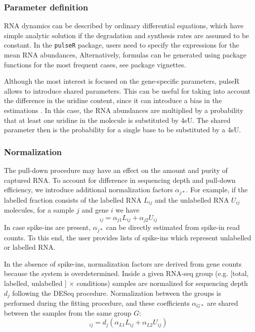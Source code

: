 \subsubsection*{Parameter definition}
RNA dynamics can be described by ordinary differential equations,
which have simple analytic solution 
if the degradation and synthesis rates are assumed to be constant.
In the \verb|pulseR| package,
users need to specify the expressions for the mean RNA abundances,
Alternatively, formulas can be generated using package functions for the 
most frequent cases, see package vignettes. 

Although the most interest is focused on the gene-specific parameters,
pulseR allows to introduce shared parameters.
 This can be useful for taking into account the difference in the uridine content, since
it can introduce a bias in the estimations \citep{miller2011dynamic,
schwalb2012measurement}.
In this case, the RNA abundances are multiplied by 
a probability that at least one uridine in the molecule is substituted by 4sU.
The shared parameter then is the probability for a single base to be substituted
by a 4sU.
\subsubsection*{Normalization}
The pull-down procedure may have an effect on the amount and purity of captured RNA.
To account for difference in sequencing depth and pull-down efficiency,
we introduce additional normalization factors $\alpha_{j*}$. 
 For example, 
if the labelled fraction consists of the labelled RNA $L_{ij}$ and the unlabelled RNA
 $U_{ij}$ molecules, for a sample $j$ and gene $i$ we have 
\begin{equation}
 [\text{labelled fraction}]_{ij}  = \alpha_{j1} L_{ij} + \alpha_{j2} U_{ij}
\end{equation}
In case spike-ins are present, $\alpha_{j*}$  can be directly estimated from spike-in read counts. 
To this end, the user provides lists of spike-ins which represent unlabelled or labelled RNA.
\par
In the absence of spike-ins, 
normalization factors are derived from gene counts
because the system is overdetermined.
Inside a given RNA-seq group (e.g. [total, labelled, unlabelled ] $\times$ conditions) samples are normalized for sequencing depth $d_j$ following the DESeq procedure.
Normalization between the groups is performed during the fitting procedure, 
and these coefficients $\alpha_{G*}$  are shared between the samples from the same group $G$:
\begin{equation}
 [\text{labelled fraction}]_{ij}  = d_j(\alpha_{L1} L_{ij} + \alpha_{L2} U_{ij})
\end{equation}

